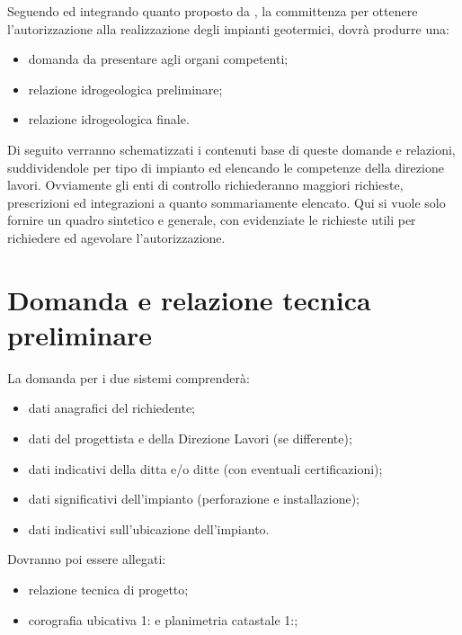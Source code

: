 Seguendo ed integrando quanto proposto da \cite{anipa}, la committenza per ottenere l'autorizzazione alla realizzazione degli impianti geotermici, dovrà produrre una:
\begin{itemize}
\item domanda da presentare agli organi competenti;
\item relazione idrogeologica preliminare;
\item relazione idrogeologica finale.
\end{itemize}

Di seguito verranno schematizzati i contenuti base di queste domande e relazioni, suddividendole per tipo di impianto ed elencando le competenze della direzione lavori. Ovviamente gli enti di controllo richiederanno maggiori richieste, prescrizioni ed integrazioni a quanto sommariamente elencato. Qui si vuole solo fornire un quadro sintetico e generale, con evidenziate le richieste utili per richiedere ed agevolare l'autorizzazione.

\newpage
\section{Domanda e relazione tecnica preliminare}
La domanda per i due sistemi comprenderà:
\begin{itemize}
\item dati anagrafici del richiedente;
\item dati del progettista e della Direzione Lavori (se differente);
\item dati indicativi della ditta e/o ditte (con eventuali certificazioni);
\item dati significativi dell'impianto (perforazione e installazione);
\item dati indicativi sull'ubicazione dell'impianto.
\end{itemize}

Dovranno poi essere allegati:
\begin{itemize}
\item relazione tecnica di progetto;
\item corografia ubicativa 1: e planimetria catastale 1:; 
\end{itemize}


